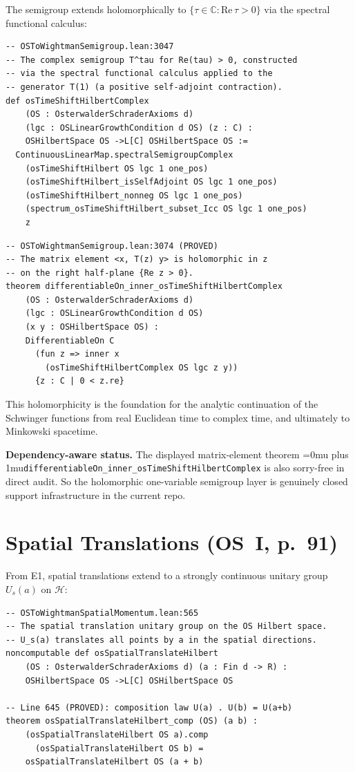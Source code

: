 \documentclass[11pt,a4paper]{article}
\newcommand{\leanname}[1]{\begingroup\Urlmuskip=0mu plus 1mu\relax\nolinkurl{#1}\endgroup}
\begin{document}
The semigroup extends holomorphically to $\{\tau \in \mathbb{C} : \mathrm{Re}\,\tau > 0\}$
via the spectral functional calculus:

\begin{lstlisting}
-- OSToWightmanSemigroup.lean:3047
-- The complex semigroup T^tau for Re(tau) > 0, constructed
-- via the spectral functional calculus applied to the
-- generator T(1) (a positive self-adjoint contraction).
def osTimeShiftHilbertComplex
    (OS : OsterwalderSchraderAxioms d)
    (lgc : OSLinearGrowthCondition d OS) (z : C) :
    OSHilbertSpace OS ->L[C] OSHilbertSpace OS :=
  ContinuousLinearMap.spectralSemigroupComplex
    (osTimeShiftHilbert OS lgc 1 one_pos)
    (osTimeShiftHilbert_isSelfAdjoint OS lgc 1 one_pos)
    (osTimeShiftHilbert_nonneg OS lgc 1 one_pos)
    (spectrum_osTimeShiftHilbert_subset_Icc OS lgc 1 one_pos)
    z
\end{lstlisting}

\begin{lstlisting}
-- OSToWightmanSemigroup.lean:3074 (PROVED)
-- The matrix element <x, T(z) y> is holomorphic in z
-- on the right half-plane {Re z > 0}.
theorem differentiableOn_inner_osTimeShiftHilbertComplex
    (OS : OsterwalderSchraderAxioms d)
    (lgc : OSLinearGrowthCondition d OS)
    (x y : OSHilbertSpace OS) :
    DifferentiableOn C
      (fun z => inner x
        (osTimeShiftHilbertComplex OS lgc z y))
      {z : C | 0 < z.re}
\end{lstlisting}

\noindent This holomorphicity is the foundation for the analytic continuation
of the Schwinger functions from real Euclidean time to complex time, and
ultimately to Minkowski spacetime.

\medskip\noindent
\textbf{Dependency-aware status.}
The displayed matrix-element theorem
\leanname{differentiableOn\_inner\_osTimeShiftHilbertComplex} is also
sorry-free in direct audit. So the holomorphic one-variable semigroup layer is
genuinely closed support infrastructure in the current repo.


\section{Spatial Translations (OS~I, p.~91)}

From E1, spatial translations extend to a strongly continuous unitary group
$U_s(a)$ on $\mathscr{H}$:

\begin{lstlisting}
-- OSToWightmanSpatialMomentum.lean:565
-- The spatial translation unitary group on the OS Hilbert space.
-- U_s(a) translates all points by a in the spatial directions.
noncomputable def osSpatialTranslateHilbert
    (OS : OsterwalderSchraderAxioms d) (a : Fin d -> R) :
    OSHilbertSpace OS ->L[C] OSHilbertSpace OS

-- Line 645 (PROVED): composition law U(a) . U(b) = U(a+b)
theorem osSpatialTranslateHilbert_comp (OS) (a b) :
    (osSpatialTranslateHilbert OS a).comp
      (osSpatialTranslateHilbert OS b) =
    osSpatialTranslateHilbert OS (a + b)
\end{lstlisting}
\end{document}
